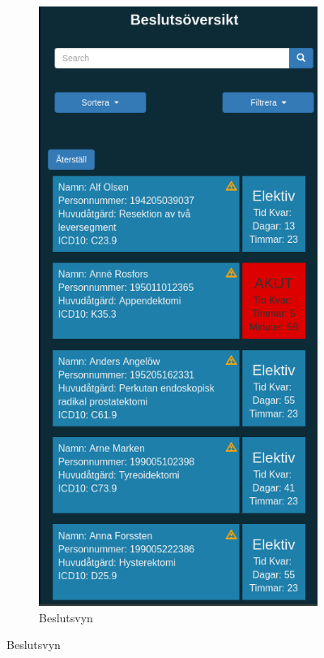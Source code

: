 \begin{figure}[H]
\begin{subfigure}[b]{0.4\linewidth}
		\includegraphics[width=\linewidth]{Figures/beslut.png}
		\caption{Beslutsvyn}
		\label{fig:beslutsvy}

\end{subfigure}
\end{figure}
